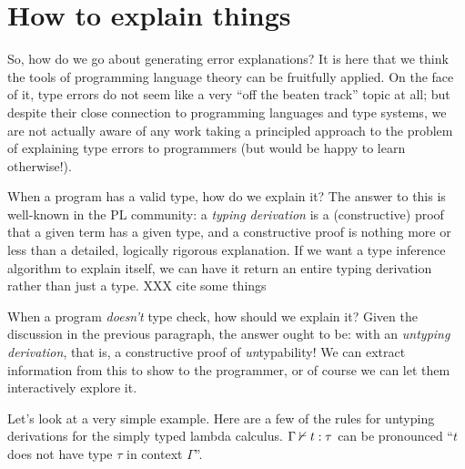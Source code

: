 \documentclass[sigplan, screen]{acmart}\settopmatter{printccs=false,printacmref=false}
\begin{document}
\section{How to explain things}

So, how do we go about generating error explanations?  It is here that
we think the tools of programming language theory can be fruitfully
applied. On the face of it, type errors do not seem like a very ``off
the beaten track'' topic at all; but despite their close connection to
programming languages and type systems, we are not actually aware of
any work taking a principled approach to the problem of explaining
type errors to programmers (but would be happy to learn otherwise!).

When a program has a valid type, how do we explain it?  The answer to
this is well-known in the PL community: a \emph{typing derivation} is
a (constructive) proof that a given term has a given type, and a
constructive proof is nothing more or less than a detailed, logically
rigorous explanation.  If we want a type inference algorithm to
explain itself, we can have it return an entire typing derivation
rather than just a type.   XXX cite some things

When a program \emph{doesn't} type check, how should we explain it?
Given the discussion in the previous paragraph, the answer ought to
be: with an \emph{untyping derivation}, that is, a constructive proof
of \emph{un}typability!  We can extract information from this to show
to the programmer, or of course we can let them interactively explore
it.

Let's look at a very simple example.  Here are a few of the rules for
untyping derivations for the simply typed lambda calculus.  ${\Gamma} \nvdash {t} : {\tau}$ can be pronounced ``$t$ does not have type $\tau$ in
context $\Gamma$''.
\end{document}
